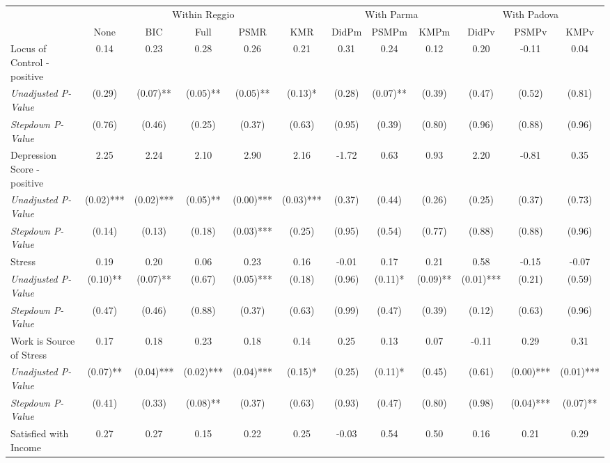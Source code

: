 \begin{tabular}{l c c c c c c c c c c c}
\toprule
& \multicolumn{5}{c}{Within Reggio} & \multicolumn{3}{c}{With Parma} & \multicolumn{3}{c}{With Padova} \\\cmidrule(lr){2-6} \cmidrule(lr){7-9} \cmidrule(lr){10-12}
 & None & BIC & Full & PSMR & KMR & DidPm & PSMPm & KMPm & DidPv & PSMPv & KMPv \\
\midrule
Locus of Control - positive & 0.14 & 0.23 & 0.28 & 0.26 & 0.21 & 0.31 & 0.24 & 0.12 & 0.20 & -0.11 & 0.04 \\
\quad \textit{Unadjusted P-Value} & (0.29) & (0.07)** & (0.05)** & (0.05)** & (0.13)* & (0.28) & (0.07)** & (0.39) & (0.47) & (0.52) & (0.81) \\
\quad \textit{Stepdown P-Value} & (0.76) & (0.46) & (0.25) & (0.37) & (0.63) & (0.95) & (0.39) & (0.80) & (0.96) & (0.88) & (0.96) \\
Depression Score - positive & 2.25 & 2.24 & 2.10 & 2.90 & 2.16 & -1.72 & 0.63 & 0.93 & 2.20 & -0.81 & 0.35 \\
\quad \textit{Unadjusted P-Value} & (0.02)*** & (0.02)*** & (0.05)** & (0.00)*** & (0.03)*** & (0.37) & (0.44) & (0.26) & (0.25) & (0.37) & (0.73) \\
\quad \textit{Stepdown P-Value} & (0.14) & (0.13) & (0.18) & (0.03)*** & (0.25) & (0.95) & (0.54) & (0.77) & (0.88) & (0.88) & (0.96) \\
Stress & 0.19 & 0.20 & 0.06 & 0.23 & 0.16 & -0.01 & 0.17 & 0.21 & 0.58 & -0.15 & -0.07 \\
\quad \textit{Unadjusted P-Value} & (0.10)** & (0.07)** & (0.67) & (0.05)*** & (0.18) & (0.96) & (0.11)* & (0.09)** & (0.01)*** & (0.21) & (0.59) \\
\quad \textit{Stepdown P-Value} & (0.47) & (0.46) & (0.88) & (0.37) & (0.63) & (0.99) & (0.47) & (0.39) & (0.12) & (0.63) & (0.96) \\
Work is Source of Stress & 0.17 & 0.18 & 0.23 & 0.18 & 0.14 & 0.25 & 0.13 & 0.07 & -0.11 & 0.29 & 0.31 \\
\quad \textit{Unadjusted P-Value} & (0.07)** & (0.04)*** & (0.02)*** & (0.04)*** & (0.15)* & (0.25) & (0.11)* & (0.45) & (0.61) & (0.00)*** & (0.01)*** \\
\quad \textit{Stepdown P-Value} & (0.41) & (0.33) & (0.08)** & (0.37) & (0.63) & (0.93) & (0.47) & (0.80) & (0.98) & (0.04)*** & (0.07)** \\
Satisfied with Income & 0.27 & 0.27 & 0.15 & 0.22 & 0.25 & -0.03 & 0.54 & 0.50 & 0.16 & 0.21 & 0.29 \\

\end{tabular}
